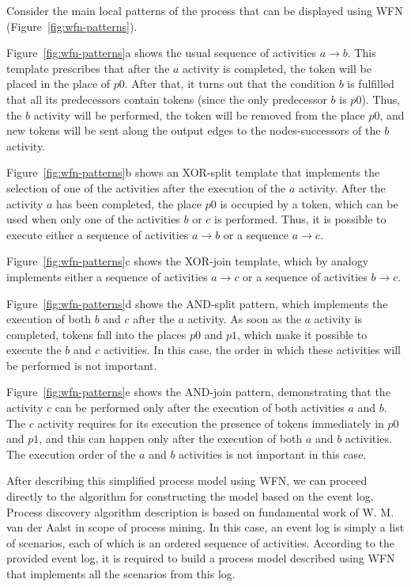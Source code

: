 \documentclass[
11pt,%
tightenlines,%
twoside,%
onecolumn,%
nofloats,%
nobibnotes,%
nofootinbib,%
superscriptaddress,%
noshowpacs,%
centertags]%
{revtex4}
\begin{document}
Consider the main local patterns of the process that can be displayed using WFN (Figure~\ref{fig:wfn-patterns}).

Figure~\ref{fig:wfn-patterns}a shows the usual sequence of activities $a \rightarrow b$.
This template prescribes that after the $a$ activity is completed, the token will be placed in the place of $p0$.
After that, it turns out that the condition $b$ is fulfilled that all its predecessors contain tokens (since the only predecessor $b$ is $p0$).
Thus, the $b$ activity will be performed, the token will be removed from the place $p0$, and new tokens will be sent along the output edges to the nodes-successors of the $b$ activity.
     
Figure~\ref{fig:wfn-patterns}b shows an XOR-split template that implements the selection of one of the activities after the execution of the $a$ activity.
After the activity $a$ has been completed, the place $p0$ is occupied by a token, which can be used when only one of the activities $b$ or $c$ is performed.
Thus, it is possible to execute either a sequence of activities $a \rightarrow b$ or a sequence $a \rightarrow c$.

Figure~\ref{fig:wfn-patterns}c shows the XOR-join template, which by analogy implements either a sequence of activities $a \rightarrow c$ or a sequence of activities $b \rightarrow c$.

Figure~\ref{fig:wfn-patterns}d shows the AND-split pattern, which implements the execution of both $b$ and $c$ after the $a$ activity.
As soon as the $a$ activity is completed, tokens fall into the places $p0$ and $p1$, which make it possible to execute the $b$ and $c$ activities.
In this case, the order in which these activities will be performed is not important.

Figure~\ref{fig:wfn-patterns}e shows the AND-join pattern, demonstrating that the activity $c$ can be performed only after the execution of both activities $a$ and $b$.
The $c$ activity requires for its execution the presence of tokens immediately in $p0$ and $p1$, and this can happen only after the execution of both $a$ and $b$ activities.
The execution order of the $a$ and $b$ activities is not important in this case.

After describing this simplified process model using WFN, we can proceed directly to the algorithm for constructing the model based on the event log.
Process discovery algorithm description is based on fundamental work of W. M. van der Aalst \cite{Aalst} in scope of process mining.
In this case, an event log is simply a list of scenarios, each of which is an ordered sequence of activities.
According to the provided event log, it is required to build a process model described using WFN that implements all the scenarios from this log.
\end{document}
